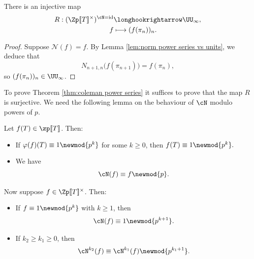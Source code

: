 \documentclass[a4paper,10pt, english, reqno]{smfart}
\newcommand{\lsem}{[\! [}
\newcommand{\rsem}{]\! ]}
\numberwithin{equation}{section}
\begin{document}

\begin{proposition} \label{prop:R}
	There is an injective map 
	\begin{align*}
		R : (\Zp\lsem T\rsem^\times)^{\cN=\mathrm{id}} &\longhookrightarrow \UU_\infty,\\
		f &\longmapsto (f(\pi_n))_n.
	\end{align*}
\end{proposition}


\begin{proof}
Suppose $\mathcal{N}(f) = f$. By Lemma \ref{lem:norm power series vs units}, we deduce that 
\begin{equation}\label{eq:cyclo norm}
N_{n+1,n}\big(f(\pi_{n+1})\big) = f(\pi_n),
\end{equation}
so $(f(\pi_n))_n \in \UU_\infty$.
\end{proof}

To prove Theorem \ref{thm:coleman power series} it suffices to prove that the map $R$ is surjective. We need the following lemma on the behaviour of $\cN$ modulo powers of $p$.

\begin{lemma} \label{lem:norm continuity} Let $f(T) \in \zp\lsem T\rsem $. Then:
\begin{itemize}
\item[(i)] If $\varphi(f)(T)\equiv 1 \newmod{p^k}$ for some $k \geq 0$, then $f(T) \equiv 1 \newmod{p^k}.$
\item[(ii)] We have
\[\cN(f) \equiv f \newmod{p}.\]
\end{itemize}
Now suppose $f \in \Zp\lsem T\rsem^\times$. Then:
\begin{itemize}
\item[(iii)] If $f \equiv 1 \newmod{p^k}$ with $k\geq 1$, then
\[\cN(f) \equiv 1 \newmod{p^{k+1}}.\]
\item[(iv)] If $k_2 \geq k_1 \geq 0$, then 
\[\cN^{k_2}(f) \equiv \cN^{k_1}(f) \newmod{p^{k_1+1}}.\]
\end{itemize}
\end{lemma} 
\end{document}
